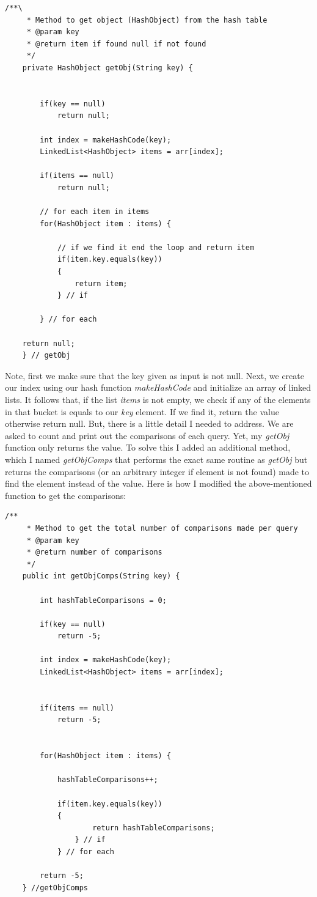 \documentclass[letterpaper, 10pt]{article}
\begin{document}
\begin{lstlisting}
/**\
     * Method to get object (HashObject) from the hash table
     * @param key
     * @return item if found null if not found
     */
    private HashObject getObj(String key) {
    	
    	
        if(key == null)
            return null;

        int index = makeHashCode(key);
        LinkedList<HashObject> items = arr[index];
        
        if(items == null)
            return null;
        
		// for each item in items
        for(HashObject item : items) {
        	
        	// if we find it end the loop and return item
            if(item.key.equals(key))
            {
                return item;
            } // if
            
        } // for each
        
    return null;    
    } // getObj
\end{lstlisting}
Note, first we make sure that the key given as input is not null. Next, we create our index using our hash function \textit{makeHashCode} and initialize an array of linked lists. It follows that, if the list \textit{items} is not empty, we check if any of the elements in that bucket is equals to our \textit{key} element. If we find it, return the value otherwise return null. But, there is a little detail I needed to address. We are asked to count and print out the comparisons of each query. Yet, my \textit{getObj} function only returns the value. To solve this I added an additional method, which I named \textit{getObjComps} that performs the exact same routine as \textit{getObj} but returns the comparisons (or an arbitrary integer if element is not found) made to find the element instead of the value. Here is how I modified the above-mentioned function to get the comparisons:
\begin{lstlisting}
/**
     * Method to get the total number of comparisons made per query
     * @param key
     * @return number of comparisons
     */
	public int getObjComps(String key) {
		
		int hashTableComparisons = 0;
		
	    if(key == null)
	        return -5;
	
	    int index = makeHashCode(key);
	    LinkedList<HashObject> items = arr[index];
	    
	    
	    if(items == null)
	        return -5;
	    
		
	    for(HashObject item : items) {
	    	
	    	hashTableComparisons++;
	    	
	        if(item.key.equals(key))
	        {
	                return hashTableComparisons;
	            } // if
	        } // for each
	    
	    return -5;
	} //getObjComps
\end{lstlisting}
\pagebreak
\end{document}

